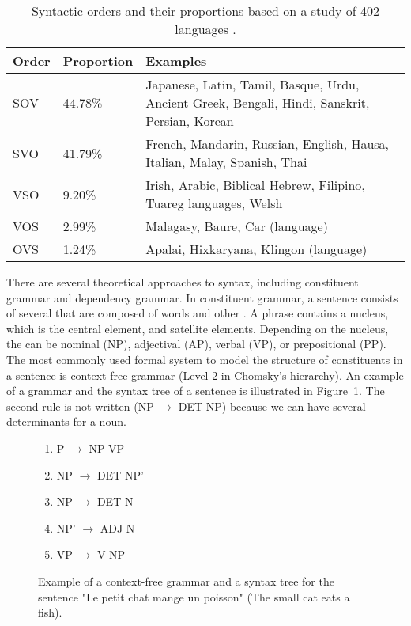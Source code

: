 \documentclass{KBook}
\begin{document}
\begin{table}[ht]
	\centering
	\begin{tabular}{p{}p{}p{}}
		\hline\hline 
		\textbf{Order} & \textbf{Proportion} & \textbf{Examples} \\
		\hline
		SOV & 44.78\% & Japanese, Latin, Tamil, Basque, Urdu, Ancient Greek, Bengali, Hindi, Sanskrit, Persian, Korean \\
		SVO & 41.79\% & French, Mandarin, Russian, English, Hausa, Italian, Malay, Spanish, Thai \\
		VSO & 9.20\% & Irish, Arabic, Biblical Hebrew, Filipino, Tuareg languages, Welsh \\
		VOS & 2.99\% & Malagasy, Baure, Car (language) \\
		OVS & 1.24\% & Apalai, Hixkaryana, Klingon (language) \\
		\hline\hline
	\end{tabular}
	\caption[Syntactic orders and their proportions according to a study of 402 languages.]{Syntactic orders and their proportions based on a study of 402 languages \cite{1988-blake}.}
	\label{tab:ordre}
\end{table}

There are several theoretical approaches to syntax, including constituent grammar and dependency grammar. In constituent grammar, a sentence consists of several  that are composed of words and other . A phrase contains a nucleus, which is the central element, and satellite elements. Depending on the nucleus, the  can be nominal (NP), adjectival (AP), verbal (VP), or prepositional (PP). The most commonly used formal system to model the structure of constituents in a sentence is context-free grammar (Level 2 in Chomsky's hierarchy). An example of a grammar and the syntax tree of a sentence is illustrated in Figure~\ref{fig.exp-gram-const}. The second rule is not written (NP $ \rightarrow $ DET NP) because we can have several determinants for a noun.

\begin{figure}[ht]
	\centering
	\begin{minipage}{0.3\textwidth}
		\begin{enumerate}
			\item P $ \rightarrow $ NP VP
			\item NP $ \rightarrow $ DET NP'
			\item NP $ \rightarrow $ DET N
			\item NP' $ \rightarrow $ ADJ N
			\item VP $ \rightarrow $ V NP
		\end{enumerate}
	\end{minipage}
	\begin{minipage}{0.3\textwidth}
	\end{minipage}
	
	\caption[Example of a context-free grammar and a syntax tree.]{Example of a context-free grammar and a syntax tree for the sentence "Le petit chat mange un poisson" (The small cat eats a fish).}
	\label{fig.exp-gram-const}
	
\end{figure}
\end{document}
